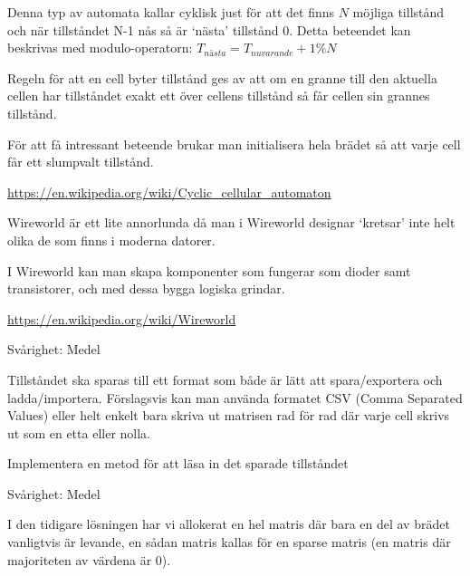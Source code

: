 
        Denna typ av automata kallar cyklisk just för att det finns $N$ möjliga tillstånd och när tillståndet N-1 nås så är `nästa' tillstånd $0$.
        Detta beteendet kan beskrivas med modulo-operatorn: $T_{nästa} = T_{nuvarande} + 1 \% N$

        Regeln för att en cell byter tillstånd ges av att om en granne till den aktuella cellen har tillståndet exakt ett över cellens tillstånd så får cellen sin grannes tillstånd.

        För att få intressant beteende brukar man initialisera hela brädet så att varje cell får ett slumpvalt tillstånd.

        \url{https://en.wikipedia.org/wiki/Cyclic_cellular_automaton}


        Wireworld är ett lite annorlunda då man i Wireworld designar `kretsar' inte helt olika de som finns i moderna datorer.

        I Wireworld kan man skapa komponenter som fungerar som dioder samt transistorer, och med dessa bygga logiska grindar.

        \url{https://en.wikipedia.org/wiki/Wireworld}


    Svårighet: Medel

        Tillståndet ska sparas till ett format som både är lätt att spara/exportera och ladda/importera.
        Förslagsvis kan man använda formatet CSV (Comma Separated Values) eller helt enkelt bara skriva
        ut matrisen rad för rad där varje cell skrivs ut som en etta eller nolla.

        Implementera en metod för att läsa in det sparade tillståndet







Svårighet: Medel

I den tidigare lösningen har vi allokerat en hel matris där bara en del av brädet vanligtvis är levande, en sådan matris kallas för en sparse matris (en matris där majoriteten av värdena är 0).




